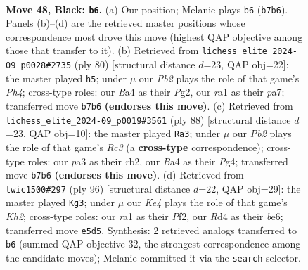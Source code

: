 \documentclass[11pt]{article}
\begin{document}
\clearpage

\begin{figure}[p]\centering
\begin{subfigure}{0.46\textwidth}\centering
\resizebox{\linewidth}{!}{%
\newchessgame
\chessboard[
  setfen={r7/1p4R1/p7/4k2B/bP1r4/P6K/8/R7 b - - 0 48},
  showmover=false,
  pgfstyle=straightmove, color=movearrow, markmove={b7-b6}
]}
\caption{}
\end{subfigure}\hfill
\begin{subfigure}{0.46\textwidth}\centering
\resizebox{\linewidth}{!}{%
\newchessgame
\chessboard[
  setfen={8/p2k4/1p6/2p3R1/5K1P/2P5/6P1/7r w - - 1 41},
  showmover=false,
  pgfstyle=straightmove, color=movearrow, markmove={h4-h5}
]}
\caption{}
\end{subfigure}
\\[4pt]
\begin{subfigure}{0.46\textwidth}\centering
\resizebox{\linewidth}{!}{%
\newchessgame
\chessboard[
  setfen={4k3/6p1/4P2p/7P/3r2P1/2R2K2/pr6/R7 w - - 0 45},
  showmover=false,
  pgfstyle=straightmove, color=movearrow, markmove={c3-a3}
]}
\caption{}
\end{subfigure}\hfill
\begin{subfigure}{0.46\textwidth}\centering
\resizebox{\linewidth}{!}{%
\newchessgame
\chessboard[
  setfen={5k2/2R3p1/4bpBp/8/6P1/7P/5P1K/3r4 w - - 2 49},
  showmover=false,
  pgfstyle=straightmove, color=movearrow, markmove={h2-g3}
]}
\caption{}
\end{subfigure}
\caption{\textbf{Move 48, Black: \texttt{b6}.} (a) Our position; Melanie plays \texttt{b6} (\texttt{b7b6}). Panels (b)--(d) are the retrieved master positions whose correspondence most drove this move (highest QAP objective among those that transfer to it). (b) Retrieved from \texttt{lichess\_elite\_2024-09\_p0028\#2735} (ply 80) [structural distance $d$=23, QAP obj=22]: the master played \texttt{h5}; under $\mu$ our \emph{Pb2} plays the role of that game's \emph{Ph4}; cross-type roles: our \emph{B}a4 as their \emph{P}g2, our \emph{r}a1 as their \emph{p}a7; transferred move \texttt{b7b6} \textbf{(endorses this move)}. (c) Retrieved from \texttt{lichess\_elite\_2024-09\_p0019\#3561} (ply 88) [structural distance $d$=23, QAP obj=10]: the master played \texttt{Ra3}; under $\mu$ our \emph{Pb2} plays the role of that game's \emph{Rc3} (a \textbf{cross-type} correspondence); cross-type roles: our \emph{p}a3 as their \emph{r}b2, our \emph{B}a4 as their \emph{P}g4; transferred move \texttt{b7b6} \textbf{(endorses this move)}. (d) Retrieved from \texttt{twic1500\#297} (ply 96) [structural distance $d$=22, QAP obj=29]: the master played \texttt{Kg3}; under $\mu$ our \emph{Ke4} plays the role of that game's \emph{Kh2}; cross-type roles: our \emph{r}a1 as their \emph{P}f2, our \emph{R}d4 as their \emph{b}e6; transferred move \texttt{e5d5}. Synthesis: 2 retrieved analogs transferred to \texttt{b6} (summed QAP objective 32, the strongest correspondence among the candidate moves); Melanie committed it via the \texttt{search} selector.}
\label{fig:thought-m95}
\end{figure}
\end{document}
